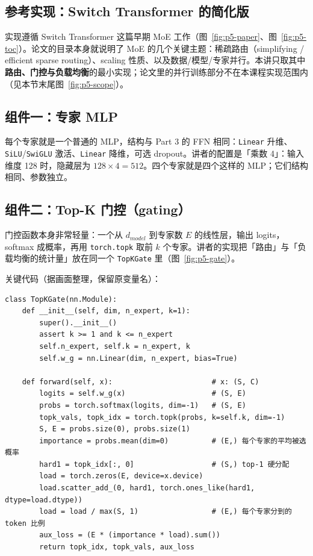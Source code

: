 \subsection{参考实现：Switch Transformer 的简化版}

实现遵循 Switch Transformer 这篇早期 MoE 工作（图~\ref{fig:p5-paper}、图~\ref{fig:p5-toc}）。论文的目录本身就说明了 MoE 的几个关键主题：稀疏路由（simplifying / efficient sparse routing）、scaling 性质、以及数据/模型/专家并行。本讲只取其中\textbf{路由、门控与负载均衡}的最小实现；论文里的并行训练部分不在本课程实现范围内（见本节末尾图~\ref{fig:p5-scope}）。

\subsection{组件一：专家 MLP}

每个专家就是一个普通的 MLP，结构与 Part 3 的 FFN 相同：\texttt{Linear} 升维、\texttt{SiLU}/\texttt{SwiGLU} 激活、\texttt{Linear} 降维，可选 dropout。讲者的配置是「乘数 4」：输入维度 128 时，隐藏层为 $128\times4=512$。四个专家就是四个这样的 MLP；它们结构相同、参数独立。

\subsection{组件二：Top-K 门控（gating）}

门控函数本身非常轻量：一个从 $d_{model}$ 到专家数 $E$ 的线性层，输出 logits，softmax 成概率，再用 \texttt{torch.topk} 取前 $k$ 个专家。讲者的实现把「路由」与「负载均衡的统计量」放在同一个 \texttt{TopKGate} 里（图~\ref{fig:p5-gate}）。

关键代码（据画面整理，保留原变量名）：

\begin{lstlisting}[caption={Top-K 门控与负载均衡辅助损失（据视频 \texttt{gating.py} 整理）：概率矩阵按 token 求专家维均值得到 importance，按 top-1 硬分配统计 load，二者相乘求和再乘专家数得到 aux loss。}]
class TopKGate(nn.Module):
    def __init__(self, dim, n_expert, k=1):
        super().__init__()
        assert k >= 1 and k <= n_expert
        self.n_expert, self.k = n_expert, k
        self.w_g = nn.Linear(dim, n_expert, bias=True)

    def forward(self, x):                       # x: (S, C)
        logits = self.w_g(x)                    # (S, E)
        probs = torch.softmax(logits, dim=-1)   # (S, E)
        topk_vals, topk_idx = torch.topk(probs, k=self.k, dim=-1)
        S, E = probs.size(0), probs.size(1)
        importance = probs.mean(dim=0)          # (E,) 每个专家的平均被选概率
        hard1 = topk_idx[:, 0]                  # (S,) top-1 硬分配
        load = torch.zeros(E, device=x.device)
        load.scatter_add_(0, hard1, torch.ones_like(hard1, dtype=load.dtype))
        load = load / max(S, 1)                 # (E,) 每个专家分到的 token 比例
        aux_loss = (E * (importance * load).sum())
        return topk_idx, topk_vals, aux_loss
\end{lstlisting}

